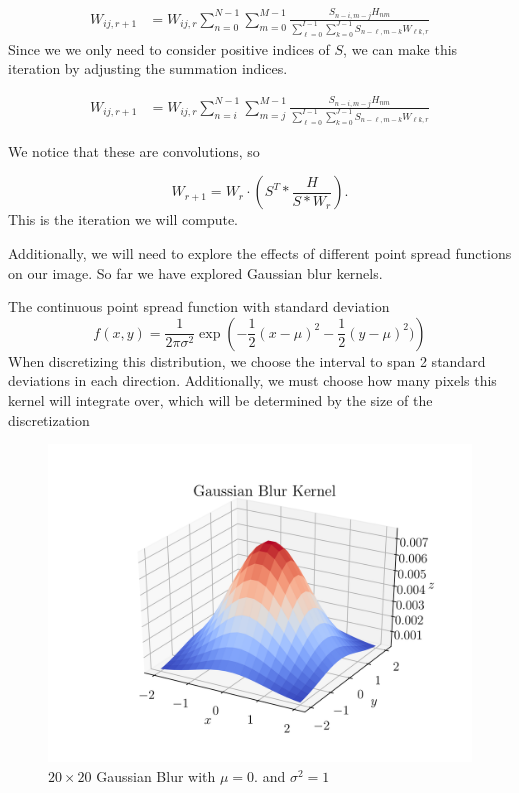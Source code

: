 \documentclass[11pt]{article}
\begin{document}
\begin{align*}
W_{ij,r+1} &= W_{ij,r} \sum \limits_{n=0}^{N-1} \sum \limits_{m=0}^{M-1} \frac{S_{n-i,m-j} H_{nm} }{ \sum \limits_{\ell = 0}^{I-1} \sum \limits_{k=0}^{J-1} S_{n-\ell,m-k}  W_{\ell k,r}}
\end{align*}
Since we we only need to consider positive indices of $S$, we can make this iteration by adjusting the summation indices.

\begin{align*}
W_{ij,r+1} &= W_{ij,r} \sum \limits_{n=i}^{N-1} \sum \limits_{m=j}^{M-1} \frac{S_{n-i,m-j} H_{nm} }{ \sum \limits_{\ell = 0}^{I-1} \sum \limits_{k=0}^{J-1} S_{n-\ell,m-k}  W_{\ell k,r}}
\end{align*}

We notice that these are convolutions, so 

$$W_{r+1} = W_{r}\cdot \left (S^{T} * \frac{H}{S*W_r} \right ).$$
This is the iteration we will compute.

Additionally, we will need to explore the effects of different point spread functions on our image. So far we have explored Gaussian blur kernels. 

The continuous point spread function with standard deviation
$$
f(x,y) = \frac{1}{2 \pi \sigma^2} \exp \left (   -\frac{1}{2}(x - \mu)^2 - \frac{1}{2}(y - \mu)^2) \right )
$$
When discretizing this distribution, we choose the interval to span 2 standard deviations in each direction. Additionally, we must choose how many pixels this kernel will integrate over, which will be determined by the size of the discretization


\begin{figure}
\centering
\includegraphics[scale = 0.8]{Gaussian.png}
\caption{ $20 \times 20$ Gaussian Blur with $\mu = 0$. and $\sigma^2 = 1$}
\end{figure}
\end{document}
